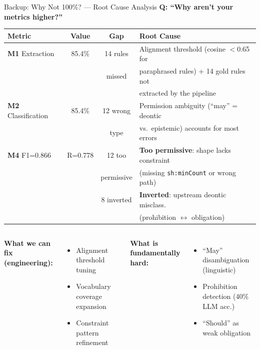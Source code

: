 \documentclass[aspectratio=169, 10pt]{beamer}
\begin{document}
\begin{frame}{Backup: Why Not 100\%? --- Root Cause Analysis}
    \textbf{Q: ``Why aren't your metrics higher?''}

    \vspace{0.2cm}
    \small
    \begin{tabular}{@{}lccl@{}}
        \toprule
        \textbf{Metric} & \textbf{Value} & \textbf{Gap} & \textbf{Root Cause} \\
        \midrule
        \textbf{M1} Extraction & 85.4\% & 14 rules & Alignment threshold (cosine $<$0.65 for \\
        & & missed & paraphrased rules) + 14 gold rules not \\
        & & & extracted by the pipeline \\
        \addlinespace
        \textbf{M2} Classification & 85.4\% & 12 wrong & Permission ambiguity (``may'' = deontic \\
        & & type & vs.\ epistemic) accounts for most errors \\
        \addlinespace
        \textbf{M4} F1=0.866 & R=0.778 & 12 too & \textbf{Too permissive}: shape lacks constraint \\
        & & permissive & (missing \texttt{sh:minCount} or wrong path) \\
        & & 8 inverted & \textbf{Inverted}: upstream deontic misclass. \\
        & & & (prohibition $\leftrightarrow$ obligation) \\
        \bottomrule
    \end{tabular}

    \vspace{0.3cm}
    \begin{columns}
        \textbf{What we can fix (engineering):}
        \begin{itemize}
            \item Alignment threshold tuning
            \item Vocabulary coverage expansion
            \item Constraint pattern refinement
        \end{itemize}

        \textbf{What is fundamentally hard:}
        \begin{itemize}
            \item ``May'' disambiguation (linguistic)
            \item Prohibition detection (40\% LLM acc.)
            \item ``Should'' as weak obligation
        \end{itemize}
    \end{columns}
\end{frame}
\end{document}
